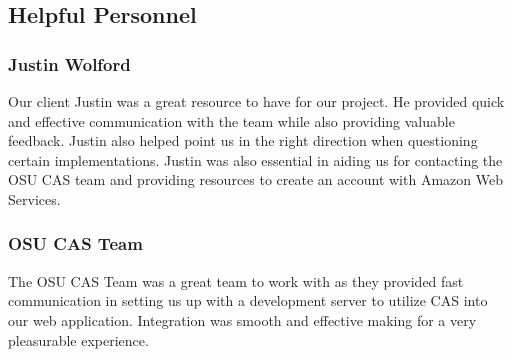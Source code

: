     \subsection{Helpful Personnel}
    \subsubsection{Justin Wolford}
    \noindent Our client Justin was a great resource to have for our project. He provided quick and effective communication with the team while also providing valuable feedback. Justin also helped point us in the right direction when questioning certain implementations. Justin was also essential in aiding us for contacting the OSU CAS team and providing resources to create an account with Amazon Web Services.\\
    
    \subsubsection{OSU CAS Team}
    \noindent The OSU CAS Team was a great team to work with as they provided fast communication in setting us up with a development server to utilize CAS into our web application. Integration was smooth and effective making for a very pleasurable experience.\\
    
    
    